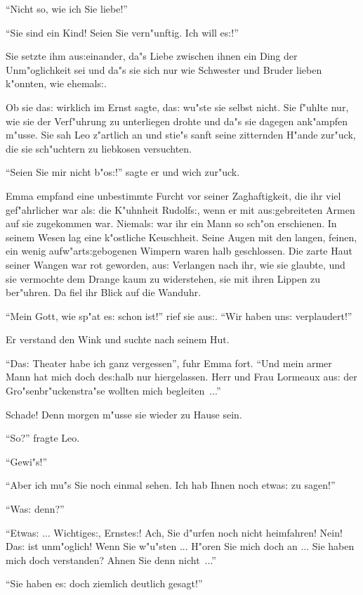 \documentclass[oneside,12pt]{book}
\newcommand{\s}{s:}%
\begin{document}
"`Nicht so, wie ich Sie liebe!"'

"`Sie sind ein Kind! Seien Sie vern"unftig. Ich will e{\s}!"'

Sie setzte ihm au{\s}einander, da"s Liebe zwischen ihnen ein Ding
der Un\-m"oglich\-keit sei und da"s sie sich nur wie Schwester und
Bruder lieben k"onnten, wie ehemal{\s}.

Ob sie da{\s} wirklich im Ernst sagte, da{\s} wu"ste sie selbst
nicht. Sie f"uhlte nur, wie sie der Verf"uhrung zu unterliegen
drohte und da"s sie dagegen ank"ampfen m"usse. Sie sah Leo
z"artlich an und stie"s sanft seine zitternden H"ande zur"uck, die
sie sch"uchtern zu liebkosen versuchten.

"`Seien Sie mir nicht b"o{\s}!"' sagte er und wich zur"uck.

Emma empfand eine unbestimmte Furcht vor seiner Zaghaftigkeit, die
ihr viel gef"ahrlicher war al{\s} die K"uhnheit Rudolf{\s}, wenn
er mit au{\s}gebreiteten Armen auf sie zugekommen war. Niemal{\s}
war ihr ein Mann so sch"on erschienen. In seinem Wesen lag eine
k"ostliche Keuschheit. Seine Augen mit den langen, feinen, ein
wenig aufw"art{\s}gebogenen Wimpern waren halb geschlossen. Die
zarte Haut seiner Wangen war rot geworden, au{\s} Verlangen nach
ihr, wie sie glaubte, und sie vermochte dem Drange kaum zu
widerstehen, sie mit ihren Lippen zu ber"uhren. Da fiel ihr Blick
auf die Wanduhr.

"`Mein Gott, wie sp"at e{\s} schon ist!"' rief sie au{\s}. "`Wir
haben un{\s} verplaudert!"'

Er verstand den Wink und suchte nach seinem Hut.

"`Da{\s} Theater habe ich ganz vergessen"', fuhr Emma fort. "`Und
mein armer Mann hat mich doch de{\s}halb nur hiergelassen. Herr
und Frau Lormeaux au{\s} der Gro"senbr"uckenstra"se wollten mich
begleiten~..."'

Schade! Denn morgen m"usse sie wieder zu Hause sein.

"`So?"' fragte Leo.

"`Gewi"s!"'

"`Aber ich mu"s Sie noch einmal sehen. Ich hab Ihnen noch etwa{\s}
zu sagen!"'

"`Wa{\s} denn?"'

"`Etwa{\s} ... Wichtige{\s}, Ernste{\s}! Ach, Sie d"urfen noch
nicht heimfahren! Nein! Da{\s} ist unm"oglich! Wenn Sie w"u"sten
... H"oren Sie mich doch an ... Sie haben mich doch verstanden?
Ahnen Sie denn nicht~..."'

"`Sie haben e{\s} doch ziemlich deutlich gesagt!"'
\end{document}
